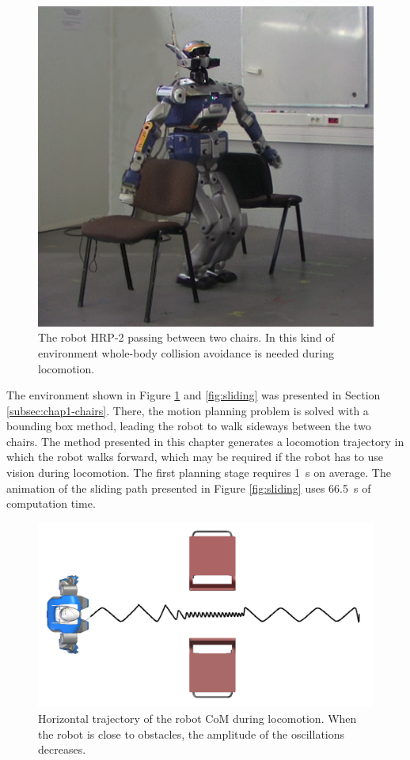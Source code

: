 \begin{figure}
\centering
\includegraphics[width=0.6\linewidth]
                {src/chap2-wholebody-planning/pics/chairs/couv.png}
\caption{The robot HRP-2 passing between two chairs. In this kind of
  environment whole-body collision avoidance is needed during
  locomotion.}
\label{fig:couv}
\end{figure}

The environment shown in Figure \ref{fig:couv} and \ref{fig:sliding}
was presented in Section \ref{subsec:chap1-chairs}. There, the motion
planning problem is solved with a bounding box method, leading the
robot to walk sideways between the two chairs. The method presented in
this chapter generates a locomotion trajectory in which the robot
walks forward, which may be required if the robot has to use vision
during locomotion. The first planning stage requires 1~s on average.
The animation of the sliding path presented in Figure
\ref{fig:sliding} uses 66.5~s of computation time.

\begin{figure}
\centering
\includegraphics[width=0.7\linewidth]
                {src/chap2-wholebody-planning/pics/chairs/waist-trajectory.png}

\caption{Horizontal trajectory of the robot CoM during
  locomotion. When the robot is close to obstacles, the amplitude of
  the oscillations decreases.}
\label{fig:chairs-waist}
\end{figure}

